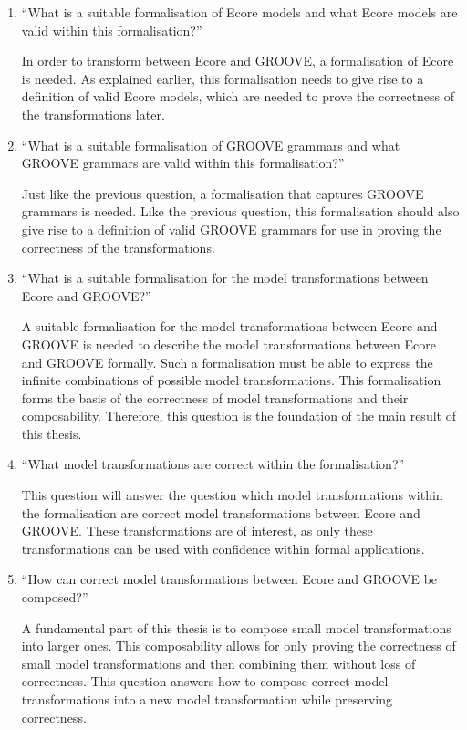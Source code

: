 \begin{enumerate}
    \item ``What is a suitable formalisation of Ecore models and what Ecore models are valid within this formalisation?'' 
    
    In order to transform between Ecore and GROOVE, a formalisation of Ecore is needed. As explained earlier, this formalisation needs to give rise to a definition of valid Ecore models, which are needed to prove the correctness of the transformations later.
    
    \item ``What is a suitable formalisation of GROOVE grammars and what GROOVE grammars are valid within this formalisation?'' 
    
    Just like the previous question, a formalisation that captures GROOVE grammars is needed. Like the previous question, this formalisation should also give rise to a definition of valid GROOVE grammars for use in proving the correctness of the transformations.
    
    \item ``What is a suitable formalisation for the model transformations between Ecore and GROOVE?'' 
    
    A suitable formalisation for the model transformations between Ecore and GROOVE is needed to describe the model transformations between Ecore and GROOVE formally. Such a formalisation must be able to express the infinite combinations of possible model transformations. This formalisation forms the basis of the correctness of model transformations and their composability. Therefore, this question is the foundation of the main result of this thesis.
    
    \item ``What model transformations are correct within the formalisation?'' 
    
    This question will answer the question which model transformations within the formalisation are correct model transformations between Ecore and GROOVE. These transformations are of interest, as only these transformations can be used with confidence within formal applications.
    
    \item ``How can correct model transformations between Ecore and GROOVE be composed?''
    
    A fundamental part of this thesis is to compose small model transformations into larger ones. This composability allows for only proving the correctness of small model transformations and then combining them without loss of correctness. This question answers how to compose correct model transformations into a new model transformation while preserving correctness.
\end{enumerate}

